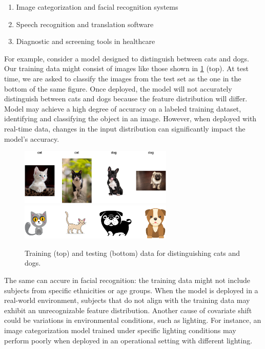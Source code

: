 	\begin{enumerate}
		\item Image categorization and facial recognition systems
		\item Speech recognition and translation software
		\item Diagnostic and screening tools in healthcare
	\end{enumerate}
	
For example, consider a model designed to distinguish between cats and dogs. Our training data might consist of images like those shown in \cref{fig:cani-gatti} (top). At test time, we are asked to classify the images from the test set as the one in the bottom of the same figure. Once deployed, the model will not accurately distinguish between cats and dogs because the feature distribution will differ. Model may achieve a high degree of accuracy on a labeled training dataset, identifying and classifying the object in an image. However, when deployed with real-time data, changes in the input distribution can significantly impact the model's accuracy.

\begin{figure}[H]
	\centering
	\includegraphics[width=0.65\textwidth]{assets/cat-dog-train.png}
	\includegraphics[width=0.65\textwidth]{assets/cat-dog-test.png} 
	\caption{Training (top) and testing (bottom) data for distinguishing cats and dogs.}
	\label{fig:cani-gatti}
\end{figure}

\newpage

The same can accure in facial recognition: the training data might not include subjects from specific ethnicities or age groups. When the model is deployed in a real-world environment, subjects that do not align with the training data may exhibit an unrecognizable feature distribution. Another cause of covariate shift could be variations in environmental conditions, such as lighting. For instance, an image categorization model trained under specific lighting conditions may perform poorly when deployed in an operational setting with different lighting.
	

